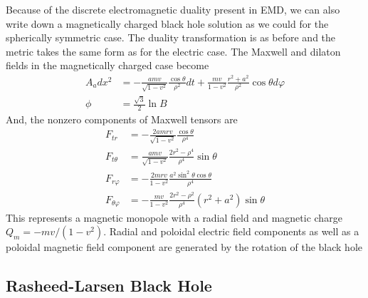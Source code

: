 \documentclass[prd]{revtex4}
\begin{document}
Because of the discrete electromagnetic duality present in EMD, we can also write down a magnetically charged black hole solution as we could for the spherically symmetric case. The duality transformation is as before and the metric takes the same form as for the electric case. The Maxwell and dilaton fields in the magnetically charged case become
\begin{align}
A_a dx^2 &= -\frac{amv}{\sqrt{1-v^2}} \frac{\cos \theta}{\rho^2} dt + \frac{mv}{1-v^2} \frac{r^2 + a^2}{\rho^2} \cos \theta d \varphi \\
\phi &= \frac{\sqrt{3}}{2} \ln B
\end{align}
And, the nonzero components of Maxwell tensors are
\begin{align}
F_{tr} &= -\frac{2amrv}{\sqrt{1-v^2}} \frac{\cos \theta}{\rho^4} \\
F_{t \theta} &= \frac{amv}{\sqrt{1-v^2}} \frac{2r^2 - \rho^4}{\rho^4} \sin \theta \\
F_{r \varphi} &= - \frac{2mrv}{1-v^2} \frac{a^2 \sin^2 \theta \cos \theta}{\rho^4} \\
F_{\theta \varphi} &= - \frac{mv}{1-v^2} \frac{2r^2 -\rho^2}{\rho^4} (r^2 + a^2) \sin \theta
\end{align}
This represents a magnetic monopole with a radial field and magnetic charge $Q_m = -mv/(1-v^2)$. Radial and poloidal electric field components as well as a poloidal magnetic field component are generated by the rotation of the black hole

\subsection{Rasheed-Larsen Black Hole}
\end{document}
